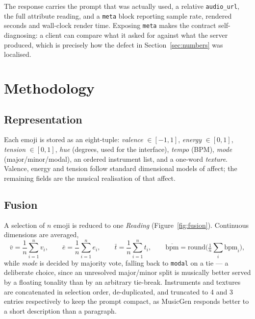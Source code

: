 \documentclass[11pt]{article}
\begin{document}
The response carries the prompt that was actually used, a relative
\texttt{audio\_url}, the full attribute reading, and a \texttt{meta} block
reporting sample rate, rendered seconds and wall-clock render time. Exposing
\texttt{meta} makes the contract self-diagnosing: a client can compare what
it asked for against what the server produced, which is precisely how the
defect in Section~\ref{sec:numbers} was localised.

\section{Methodology}

\subsection{Representation}
Each emoji is stored as an eight-tuple: \emph{valence} $\in[-1,1]$,
\emph{energy} $\in[0,1]$, \emph{tension} $\in[0,1]$, \emph{hue} (degrees,
used for the interface), \emph{tempo} (BPM), \emph{mode}
(major/minor/modal), an ordered instrument list, and a one-word
\emph{texture}. Valence, energy and tension follow standard dimensional
models of affect; the remaining fields are the musical realisation of that
affect.

\subsection{Fusion}
A selection of $n$ emoji is reduced to one \emph{Reading} (Figure~\ref{fig:fusion}).
Continuous dimensions are averaged,
\begin{equation}
\bar{v}=\frac{1}{n}\sum_{i=1}^{n} v_i,\qquad
\bar{e}=\frac{1}{n}\sum_{i=1}^{n} e_i,\qquad
\bar{t}=\frac{1}{n}\sum_{i=1}^{n} t_i,\qquad
\overline{\text{bpm}}=\mathrm{round}\Big(\tfrac{1}{n}\textstyle\sum_i \text{bpm}_i\Big),
\end{equation}
while \emph{mode} is decided by majority vote, falling back to
\texttt{modal} on a tie --- a deliberate choice, since an unresolved
major/minor split is musically better served by a floating tonality than by
an arbitrary tie-break. Instruments and textures are concatenated in
selection order, de-duplicated, and truncated to 4 and 3 entries
respectively to keep the prompt compact, as MusicGen responds better to a
short description than a paragraph.
\end{document}
